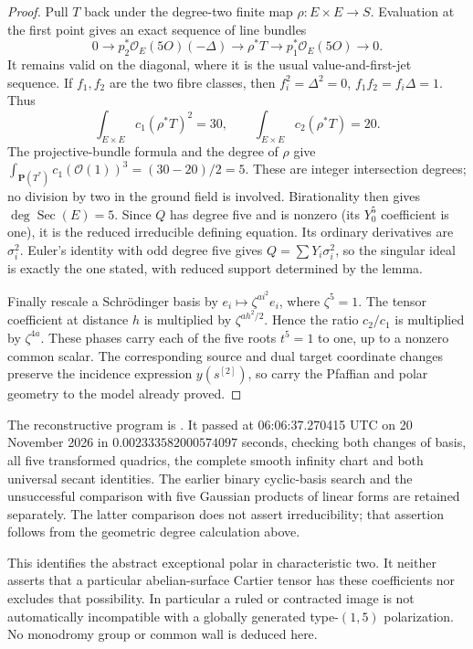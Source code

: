 \begin{proof}
Pull \(T\) back under the degree-two finite map
\(\rho:E\times E\to S\). Evaluation at the first point gives
an exact sequence of line bundles
\[
 0\longrightarrow p_2^*\mathcal O_E(5O)(-\Delta)
 \longrightarrow\rho^*T
 \longrightarrow p_1^*\mathcal O_E(5O)\longrightarrow0.
 \tag{SQ5.8}
\]
It remains valid on the diagonal, where it is the usual
value-and-first-jet sequence. If \(f_1,f_2\) are the two
fibre classes, then \(f_i^2=\Delta^2=0\),
\(f_1f_2=f_i\Delta=1\). Thus
\[
 \int_{E\times E}c_1(\rho^*T)^2=30,
 \qquad \int_{E\times E}c_2(\rho^*T)=20.
 \tag{SQ5.9}
\]
The projective-bundle formula and the degree of \(\rho\) give
\(\int_{\mathbf P(T^*)}c_1(\mathcal O(1))^3=(30-20)/2=5\).
These are integer intersection degrees; no division by two in
the ground field is involved. Birationality then gives
\(\deg\operatorname{Sec}(E)=5\).
Since \(Q\) has degree five and is nonzero (its \(Y_0^5\)
coefficient is one), it is the reduced irreducible defining
equation. Its ordinary derivatives are \(\sigma_i^2\).
Euler's identity with odd degree five gives
\(Q=\sum Y_i\sigma_i^2\), so the singular ideal is exactly
the one stated, with reduced support determined by the lemma.

Finally rescale a Schr\"odinger basis by
\(e_i\mapsto\zeta^{a i^2}e_i\), where \(\zeta^5=1\).
The tensor coefficient at distance \(h\) is multiplied by
\(\zeta^{a h^2/2}\). Hence the ratio \(c_2/c_1\) is
multiplied by \(\zeta^{4a}\). These phases carry each of the
five roots \(t^5=1\) to one, up to a nonzero common scalar.
The corresponding source and dual target coordinate changes
preserve the incidence expression \(y(s^{[2]})\), so carry
the Pfaffian and polar geometry to the model already proved.
\end{proof}

\begin{remark}
\label{rem:prime-five-supersingular-secant-scope}
The reconstructive program is
.
It passed at 06:06:37.270415 UTC on 20 November 2026 in
\(0.002333582000574097\) seconds, checking both changes of
basis, all five transformed quadrics, the complete smooth
infinity chart and both universal secant identities. The earlier
binary cyclic-basis search and the unsuccessful comparison with
five Gaussian products of linear forms are retained separately.
The latter comparison does not assert irreducibility; that
assertion follows from the geometric degree calculation above.

This identifies the abstract exceptional polar in characteristic
two. It neither asserts that a particular abelian-surface Cartier
tensor has these coefficients nor excludes that possibility.
In particular a ruled or contracted image is not automatically
incompatible with a globally generated type-\((1,5)\) polarization.
No monodromy group or common wall is deduced here.
\end{remark}
